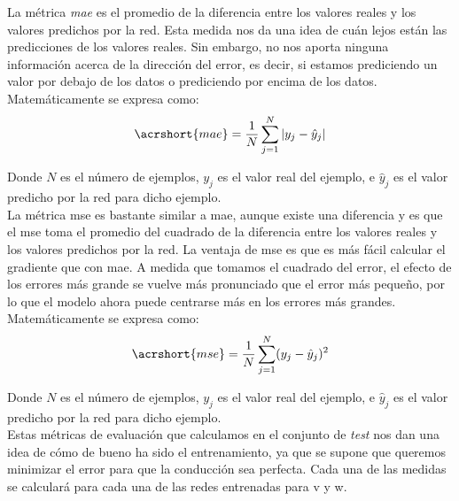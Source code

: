 La métrica \textit{\acrfull{mae}} es el promedio de la diferencia entre los valores reales y los valores predichos por la red. Esta medida nos da una idea de cuán lejos están las predicciones de los valores reales. Sin embargo, no nos aporta ninguna información acerca de la dirección del error, es decir, si estamos prediciendo un valor por debajo de los datos o prediciendo por encima de los datos. Matemáticamente se expresa como:\\

\begin{equation}\label{eq:mae_reg}
    \acrshort{mae} = \frac{1}{N}\sum_{j=1}^{N}|y_j - \hat{y}_j|
\end{equation}
\vspace{10pt}

Donde \(N\) es el número de ejemplos, \(y_j\) es el valor real del ejemplo, e \(\hat{y}_j\) es el valor predicho por la red para dicho ejemplo.\\

La métrica \acrfull{mse} es bastante similar a \acrfull{mae}, aunque existe una diferencia y es que el \acrshort{mse} toma el promedio del cuadrado de la diferencia entre los valores reales y los valores predichos por la red. La ventaja de \acrshort{mse} es que es más fácil calcular el gradiente que con \acrshort{mae}. A medida que tomamos el cuadrado del error, el efecto de los errores más grande se vuelve más pronunciado que el error más pequeño, por lo que el modelo ahora puede centrarse más en los errores más grandes. Matemáticamente se expresa como:\\

\begin{equation}\label{eq:mse_reg}
    \acrshort{mse} = \frac{1}{N}\sum_{j=1}^{N}(y_j - \hat{y}_j)^2
\end{equation}
\vspace{10pt}

Donde \(N\) es el número de ejemplos, \(y_j\) es el valor real del ejemplo, e \(\hat{y}_j\) es el valor predicho por la red para dicho ejemplo.\\

Estas métricas de evaluación que calculamos en el conjunto de \textit{test} nos dan una idea de cómo de bueno ha sido el entrenamiento, ya que se supone que queremos minimizar el error para que la conducción sea perfecta. Cada una de las medidas se calculará para cada una de las redes entrenadas para v y w.\\

